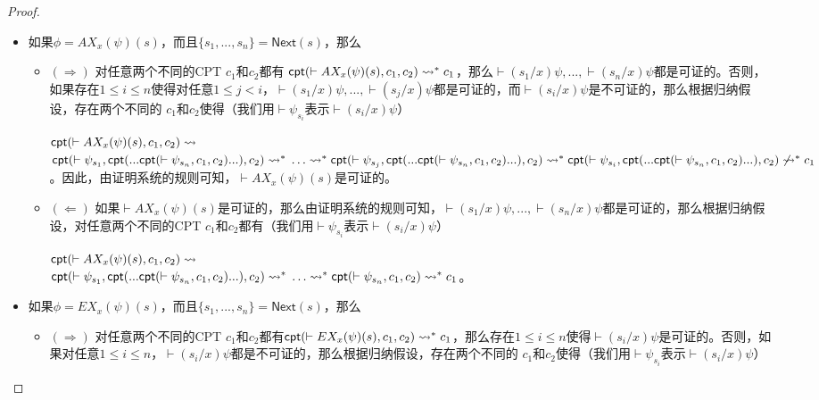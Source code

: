 \begin{proof}
\begin{itemize}
		\item 如果$\phi = AX_x(\psi)(s)$，而且$\{s_1,...,s_n\}=\textsf{Next}(s)$，那么
		\begin{itemize}
			\item $(\Rightarrow)$ 对任意两个不同的\textsf{CPT} $c_1$和$c_2$都有
			$\textsf{cpt}(\vdash AX_x(\psi)(s), c_1, c_2)\rightsquigarrow^* c_1$，那么$\vdash(s_1/x)\psi,...,\vdash(s_n/x)\psi$都是可证的。否则，如果存在$1\le i\le n$使得对任意$1\le j < i$，$\vdash(s_1/x)\psi,...,\vdash(s_j/x)\psi$都是可证的，而$\vdash(s_i/x)\psi$是不可证的，那么根据归纳假设，存在两个不同的 \CPT{} $c_1$和$c_2$使得（我们用$\vdash\psi_{s_i}$表示$\vdash(s_i/x)\psi$）
			
			$\textsf{cpt}(\vdash
			AX_x(\psi)(s), c_1, c_2)\rightsquigarrow$ \\
			$\textsf{cpt}(\vdash\psi_{s_1},
			\textsf{cpt}(...\textsf{cpt}(\vdash\psi_{s_n}, c_1,
			c_2)...), c_2)\rightsquigarrow^*\\
			\ldots\rightsquigarrow^*\\
			\textsf{cpt}(\vdash\psi_{s_j},
			\textsf{cpt}(...\textsf{cpt}(\vdash\psi_{s_n}, c_1,
			c_2)...), c_2)\rightsquigarrow^*\\
			\textsf{cpt}(\vdash\psi_{s_i},
			\textsf{cpt}(...\textsf{cpt}(\vdash\psi_{s_n}, c_1,
			c_2)...), c_2)\not\rightsquigarrow^*
			c_1$。因此，由证明系统的规则可知，$\vdash AX_x(\psi)(s)$是可证的。
			\item $(\Leftarrow)$ 如果$\vdash AX_x(\psi)(s)$是可证的，那么由证明系统的规则可知，$\vdash(s_1/x)\psi,...,\vdash(s_n/x)\psi$都是可证的，那么根据归纳假设，对任意两个不同的\textsf{CPT} $c_1$和$c_2$都有（我们用$\vdash\psi_{s_i}$表示$\vdash(s_i/x)\psi$） 
			
			$\textsf{cpt}(\vdash
			AX_x(\psi)(s), c_1, c_2)\rightsquigarrow$ \\
			$\textsf{cpt}(\vdash\psi_{s_1},
			\textsf{cpt}(...\textsf{cpt}(\vdash\psi_{s_n}, c_1,
			c_2)...), c_2)\rightsquigarrow^*\\
			\ldots\rightsquigarrow^*\\
			\textsf{cpt}(\vdash\psi_{s_n}, c_1,
			c_2)\rightsquigarrow^*c_1$。
		\end{itemize}
		
		\item 如果$\phi = EX_x(\psi)(s)$，而且$\{s_1,...,s_n\}=\textsf{Next}(s)$，那么
		\begin{itemize}
			\item $(\Rightarrow)$ 对任意两个不同的\textsf{CPT} $c_1$和$c_2$都有$\textsf{cpt}(\vdash EX_x(\psi)(s), c_1, c_2)\rightsquigarrow^* c_1$，那么存在$1\le i\le n$使得$\vdash(s_i/x)\psi$是可证的。否则，如果对任意$1\le i\le n$，$\vdash(s_i/x)\psi$都是不可证的，那么根据归纳假设，存在两个不同的\CPT{} $c_1$和$c_2$使得（我们用$\vdash\psi_{s_i}$表示$\vdash(s_i/x)\psi$）
			

\end{itemize}
\end{itemize}
\end{proof}
